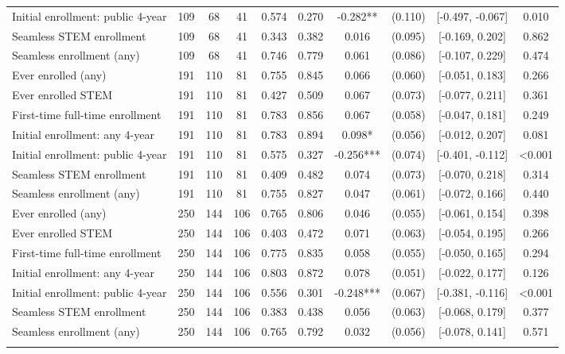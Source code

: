 \begin{table}[t]
\begin{tabular*}{\linewidth}{@{\extracolsep{\fill}}l|ccccccccc}
Initial enrollment: public 4-year & 109 & 68 & 41 & 0.574 & 0.270 & -0.282** & (0.110) & [-0.497, -0.067] & 0.010 \\ 
Seamless STEM enrollment & 109 & 68 & 41 & 0.343 & 0.382 & 0.016 & (0.095) & [-0.169, 0.202] & 0.862 \\ 
Seamless enrollment (any) & 109 & 68 & 41 & 0.746 & 0.779 & 0.061 & (0.086) & [-0.107, 0.229] & 0.474 \\ 
Ever enrolled (any) & 191 & 110 & 81 & 0.755 & 0.845 & 0.066 & (0.060) & [-0.051, 0.183] & 0.266 \\ 
Ever enrolled STEM & 191 & 110 & 81 & 0.427 & 0.509 & 0.067 & (0.073) & [-0.077, 0.211] & 0.361 \\ 
First-time full-time enrollment & 191 & 110 & 81 & 0.783 & 0.856 & 0.067 & (0.058) & [-0.047, 0.181] & 0.249 \\ 
Initial enrollment: any 4-year & 191 & 110 & 81 & 0.783 & 0.894 & 0.098* & (0.056) & [-0.012, 0.207] & 0.081 \\ 
Initial enrollment: public 4-year & 191 & 110 & 81 & 0.575 & 0.327 & -0.256*** & (0.074) & [-0.401, -0.112] & <0.001 \\ 
Seamless STEM enrollment & 191 & 110 & 81 & 0.409 & 0.482 & 0.074 & (0.073) & [-0.070, 0.218] & 0.314 \\ 
Seamless enrollment (any) & 191 & 110 & 81 & 0.755 & 0.827 & 0.047 & (0.061) & [-0.072, 0.166] & 0.440 \\ 
Ever enrolled (any) & 250 & 144 & 106 & 0.765 & 0.806 & 0.046 & (0.055) & [-0.061, 0.154] & 0.398 \\ 
Ever enrolled STEM & 250 & 144 & 106 & 0.403 & 0.472 & 0.071 & (0.063) & [-0.054, 0.195] & 0.266 \\ 
First-time full-time enrollment & 250 & 144 & 106 & 0.775 & 0.835 & 0.058 & (0.055) & [-0.050, 0.165] & 0.294 \\ 
Initial enrollment: any 4-year & 250 & 144 & 106 & 0.803 & 0.872 & 0.078 & (0.051) & [-0.022, 0.177] & 0.126 \\ 
Initial enrollment: public 4-year & 250 & 144 & 106 & 0.556 & 0.301 & -0.248*** & (0.067) & [-0.381, -0.116] & <0.001 \\ 
Seamless STEM enrollment & 250 & 144 & 106 & 0.383 & 0.438 & 0.056 & (0.063) & [-0.068, 0.179] & 0.377 \\ 
Seamless enrollment (any) & 250 & 144 & 106 & 0.765 & 0.792 & 0.032 & (0.056) & [-0.078, 0.141] & 0.571 \\ 
\midrule\addlinespace[2.5pt]
\multicolumn{10}{l}{{\itshape \textbf{Panel B: Enrollment Outcomes} \emph{(NSC-matched students only)}}} \\[2.5pt] 

\end{tabular*}
\end{table}
